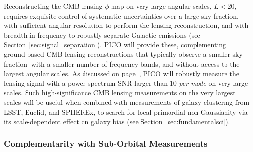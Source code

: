 \documentclass[PICOReport.tex]{subfiles}
\begin{document}
Reconstructing the CMB lensing $\phi$ map on very large angular scales, $L<20$, requires exquisite control of systematic uncertainties over a large sky fraction, with sufficient angular resolution to perform the lensing reconstruction, and with breadth in frequency to robustly separate Galactic emissions (see Section~\ref{sec:signal_separation}). PICO will provide these, complementing ground-based CMB lensing reconstructions that typically observe a smaller sky fraction, with a smaller number of frequency bands, and without access to the largest angular scales. As discussed on page~\pageref{gravitationallensing}, PICO will robustly measure the lensing signal with a power spectrum \ac{SNR} larger than 10 {\it per mode} on very large scales. Such high-significance CMB lensing measurements on the very largest scales will be useful when combined with measurements of galaxy clustering from LSST, Euclid, and SPHEREx, 
to search for local primordial non-Gaussianity via its scale-dependent effect on galaxy bias (see Section~\ref{sec:fundamentalsci}).


\subsubsection{Complementarity with Sub-Orbital Measurements}
\end{document}
